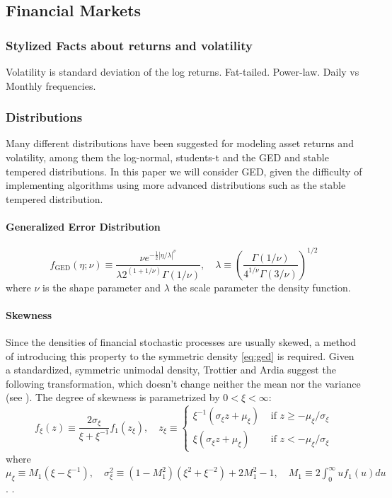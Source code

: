 \documentclass[11pt,a4paper]{article}
\begin{document}
\subsection{Financial Markets}

\subsubsection{Stylized Facts about returns and volatility}
Volatility is standard deviation of the log returns.
Fat-tailed. Power-law. Daily vs Monthly frequencies. 

\subsubsection{Distributions}
Many different distributions have been suggested for modeling asset returns and volatility, among them the log-normal, students-t and the \ac{GED} and stable tempered distributions. 
In this paper we will consider  \ac{GED}, given the difficulty of implementing algorithms using more advanced distributions such as the stable tempered distribution. 

\paragraph{Generalized Error Distribution}
\begin{equation} \label{eq:ged}
f_{\mathrm{GED}}(\eta ; \nu) \equiv \frac{\nu e^{-\frac{1}{2}|\eta / \lambda|^\nu}}{\lambda 2^{(1+1 / \nu)} \Gamma(1 / \nu)}, \quad \lambda \equiv\left(\frac{\Gamma(1 / \nu)}{4^{1 / \nu} \Gamma(3 / \nu)}\right)^{1 / 2}
\end{equation}
where $\nu$ is the shape parameter and $\lambda$ the scale parameter the density function.

\paragraph{Skewness}
Since the densities of financial stochastic processes are usually skewed, a method of introducing this property to the symmetric density \cref{eq:ged} is required. Given a standardized, symmetric unimodal density, Trottier and Ardia suggest the following transformation, which doesn't change neither the mean nor the variance (see \cite{trottier_moments_2015}). The degree of skewness is parametrized by $0<\xi<\infty$:
\begin{equation} \label{eq:skewness}
	f_{\xi}(z) \equiv \frac{2 \sigma_{\xi}}{\xi+\xi^{-1}} f_1\left(z_{\xi}\right), \quad z_{\xi} \equiv \begin{cases}\xi^{-1}\left(\sigma_{\xi} z+\mu_{\xi}\right) & \text { if } z \geq-\mu_{\xi} / \sigma_{\xi} \\ \xi\left(\sigma_{\xi} z+\mu_{\xi}\right) & \text { if } z<-\mu_{\xi} / \sigma_{\xi}\end{cases}
\end{equation} 
where $\mu_{\xi} \equiv M_1\left(\xi-\xi^{-1}\right), \quad \sigma_{\xi}^2 \equiv\left(1-M_1^2\right)\left(\xi^2+\xi^{-2}\right)+2 M_1^2-1, \quad M_1 \equiv 2 \int_0^{\infty} u f_1(u) d u$. .
\end{document}
